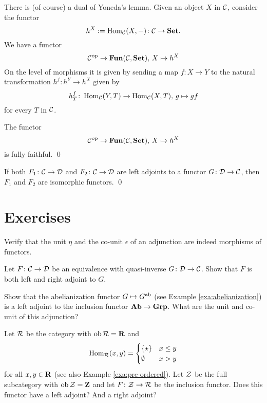 There is (of course) a dual of Yoneda's lemma. Given an object $X$ in ${\mathcal{C}}$, consider the functor
\[
	h^X := \operatorname{Hom}_{\mathcal{C}}(X,-)\colon {\mathcal{C}} \to \mathbf{Set}.
\]
We have a functor
\[
	{\mathcal{C}}^{\mathrm{op}} \to \mathbf{Fun}({\mathcal{C}},\mathbf{Set}),\, X \mapsto h^X
\]
On the level of morphisms it is given by sending a map $f\colon X \to Y$ to the natural transformation $h^f\colon h^Y \to h^X$ given by
\[
	h^f_T\colon \operatorname{Hom}_{\mathcal{C}}(Y,T) \to \operatorname{Hom}_{\mathcal{C}}(X,T),\, g \mapsto gf
\]
for every $T$ in ${\mathcal{C}}$.

\begin{theorem}\label{thm:co-yoneda}
The functor
\[
	{\mathcal{C}}^{\mathrm{op}} \to \mathbf{Fun}({\mathcal{C}},\mathbf{Set}),\, X \mapsto h^X
\]
is fully faithful. \qed
\end{theorem}

\begin{corollary}
If both $F_1\colon {\mathcal{C}} \to {\mathcal{D}}$ and $F_2\colon {\mathcal{C}} \to {\mathcal{D}}$ are left adjoints to a functor $G\colon {\mathcal{D}} \to {\mathcal{C}}$, then $F_1$ and $F_2$ are isomorphic functors. \qed
\end{corollary}


\newpage
\section*{Exercises}

\begin{exercise}
Verify that the unit $\eta$ and the co-unit $\epsilon$ of an adjunction are indeed morphisms of functors.
\end{exercise}

\begin{exercise}
Let $F\colon {\mathcal{C}} \to {\mathcal{D}}$ be an equivalence  with quasi-inverse $G\colon {\mathcal{D}} \to {\mathcal{C}}$. Show that $F$ is both left and right adjoint to $G$.
\end{exercise}

\begin{exercise}\label{exc:abelianization-adjunction}
Show that the abelianization functor $G\mapsto G^{\mathrm{ab}}$ (see Example \ref{exa:abelianization}) is a left adjoint to the inclusion functor $\mathbf{Ab} \to \mathbf{Grp}$. What are the unit and co-unit of this adjunction?
\end{exercise}

\begin{exercise}\label{exc:ordered-Z-and-R}
Let ${\mathcal{R}}$ be the category with $\operatorname{ob} {\mathcal{R}}  = {\mathbf{R}}$ and 
\[
	\operatorname{Hom}_{\mathcal{R}}(x,y) = \begin{cases}
	\{\star\} & x\leq y \\
	\emptyset & x > y
	\end{cases}
\]
for all $x,y\in {\mathbf{R}}$ (see also Example \ref{exa:pre-ordered}). Let ${\mathcal{Z}}$ be the full subcategory with $\operatorname{ob} {\mathcal{Z}} ={\mathbf{Z}}$ and let $F\colon {\mathcal{Z}} \to {\mathcal{R}}$ be the inclusion functor. Does this functor have a left adjoint? And a right adjoint? 
\end{exercise}

